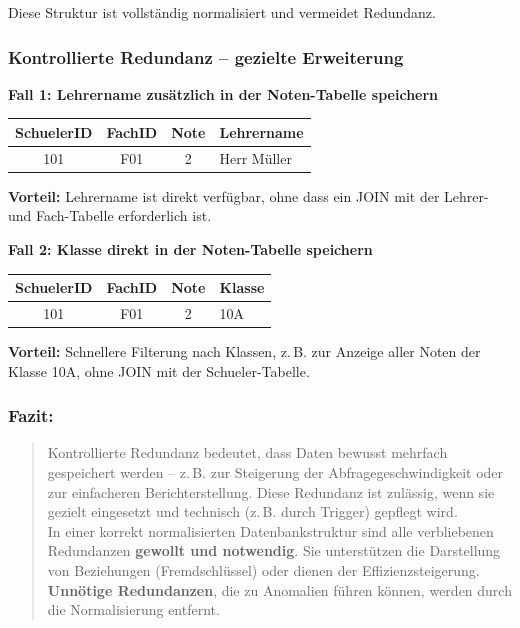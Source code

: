 \documentclass[a4paper,12pt]{article}
\begin{document}
\begin{enumerate}
			Diese Struktur ist vollständig normalisiert und vermeidet Redundanz.
			
			\subsubsection*{Kontrollierte Redundanz – gezielte Erweiterung}
			
			\textbf{Fall 1: Lehrername zusätzlich in der Noten-Tabelle speichern}
			
			\begin{tabular}{|c|c|c|l|}
				\hline
				\textbf{SchuelerID} & \textbf{FachID} & \textbf{Note} & \textbf{Lehrername} \\
				\hline
				101 & F01 & 2 & Herr Müller \\
				\hline
			\end{tabular}
			
			\textbf{Vorteil:} Lehrername ist direkt verfügbar, ohne dass ein JOIN mit der Lehrer- und Fach-Tabelle erforderlich ist.
			
			\vspace{1em}
			
			\textbf{Fall 2: Klasse direkt in der Noten-Tabelle speichern}
			
			\begin{tabular}{|c|c|c|l|}
				\hline
				\textbf{SchuelerID} & \textbf{FachID} & \textbf{Note} & \textbf{Klasse} \\
				\hline
				101 & F01 & 2 & 10A \\
				\hline
			\end{tabular}
			
			\textbf{Vorteil:} Schnellere Filterung nach Klassen, z.\,B. zur Anzeige aller Noten der Klasse 10A, ohne JOIN mit der Schueler-Tabelle.
			
			\subsubsection*{Fazit:}
			
			\begin{quote}
				Kontrollierte Redundanz bedeutet, dass Daten bewusst mehrfach gespeichert werden – z.\,B. zur Steigerung der Abfragegeschwindigkeit oder zur einfacheren Berichterstellung. Diese Redundanz ist zulässig, wenn sie gezielt eingesetzt und technisch (z.\,B. durch Trigger) gepflegt wird.\\
				In einer korrekt normalisierten Datenbankstruktur sind alle verbliebenen Redundanzen \textbf{gewollt und notwendig}. Sie unterstützen die Darstellung von Beziehungen (Fremdschlüssel) oder dienen der Effizienzsteigerung. \textbf{Unnötige Redundanzen}, die zu Anomalien führen können, werden durch die Normalisierung entfernt.
			\end{quote}
			

\end{enumerate}
\end{document}
